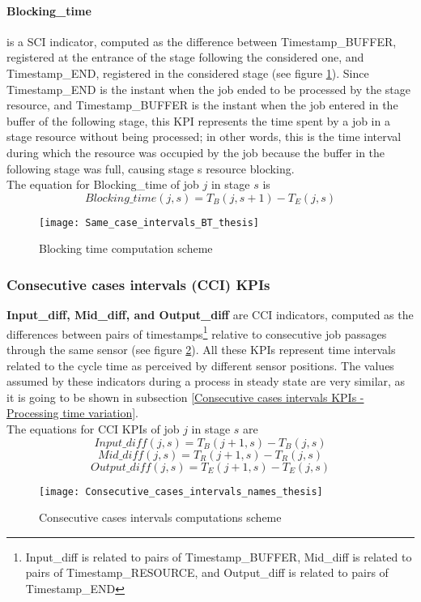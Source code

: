 \paragraph{Blocking\_time} is a SCI indicator, computed as the difference between Timestamp\_BUFFER, registered at the entrance of the stage following the considered one, and Timestamp\_END, registered in the considered stage (see figure \ref{fig:Blocking time scheme}). Since Timestamp\_END is the instant when the job ended to be processed by the stage resource, and Timestamp\_BUFFER is the instant when the job entered in the buffer of the following stage, this KPI represents the time spent by a job in a stage resource without being processed; in other words, this is the time interval during which the resource was occupied by the job because the buffer in the following stage was full, causing stage s resource blocking. \\
The equation for Blocking\_time of job $j$ in stage $s$ is
\[Blocking\_time(j,s)=T_B(j,s+1)-T_E(j,s)\]
\begin{figure}[H] 
\centering    
\texttt{[image: Same\_case\_intervals\_BT\_thesis]}
\caption[Blocking time computation scheme]{Blocking time computation scheme}
\label{fig:Blocking time scheme}
\end{figure}
\subsubsection{Consecutive cases intervals (CCI) KPIs}
\textbf{Input\_diff, Mid\_diff, and Output\_diff} are CCI indicators, computed as the differences between pairs of timestamps\footnote{Input\_diff is related to pairs of Timestamp\_BUFFER, Mid\_diff is related to pairs of Timestamp\_RESOURCE, and Output\_diff is related to pairs of Timestamp\_END} relative to consecutive job passages through the same sensor (see figure \ref{fig:Consecutive cases intervals scheme}). All these KPIs represent time intervals related to the cycle time as perceived by different sensor positions. The values assumed by these indicators during a process in steady state are very similar, as it is going to be shown in subsection \ref{Consecutive cases intervals KPIs - Processing time variation}. \\
The equations for CCI KPIs of job $j$ in stage $s$ are
\[Input\_diff(j,s)=T_B(j+1,s)-T_B(j,s)\]
\[Mid\_diff(j,s)=T_R(j+1,s)-T_R(j,s)\]
\[Output\_diff(j,s)=T_E(j+1,s)-T_E(j,s)\]
\begin{figure}[H] 
\centering    
\texttt{[image: Consecutive\_cases\_intervals\_names\_thesis]}
\caption[Consecutive cases intervals computations scheme]{Consecutive cases intervals computations scheme}
\label{fig:Consecutive cases intervals scheme}
\end{figure}
